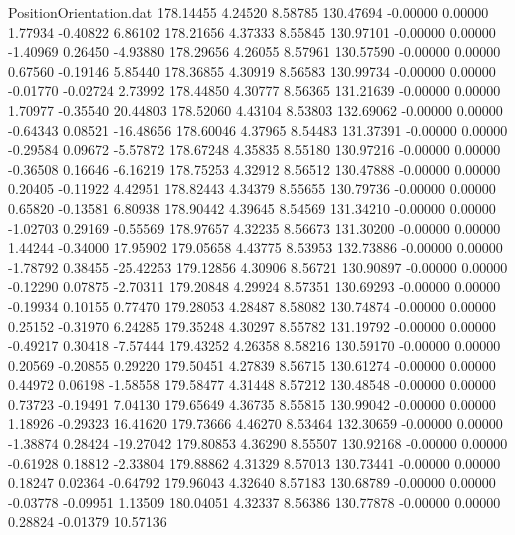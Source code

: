 \begin{filecontents}{PositionOrientation.dat}
 178.14455    4.24520    8.58785   130.47694   -0.00000    0.00000    1.77934   -0.40822    6.86102
 178.21656    4.37333    8.55845   130.97101   -0.00000    0.00000   -1.40969    0.26450   -4.93880
 178.29656    4.26055    8.57961   130.57590   -0.00000    0.00000    0.67560   -0.19146    5.85440
 178.36855    4.30919    8.56583   130.99734   -0.00000    0.00000   -0.01770   -0.02724    2.73992
 178.44850    4.30777    8.56365   131.21639   -0.00000    0.00000    1.70977   -0.35540   20.44803
 178.52060    4.43104    8.53803   132.69062   -0.00000    0.00000   -0.64343    0.08521  -16.48656
 178.60046    4.37965    8.54483   131.37391   -0.00000    0.00000   -0.29584    0.09672   -5.57872
 178.67248    4.35835    8.55180   130.97216   -0.00000    0.00000   -0.36508    0.16646   -6.16219
 178.75253    4.32912    8.56512   130.47888   -0.00000    0.00000    0.20405   -0.11922    4.42951
 178.82443    4.34379    8.55655   130.79736   -0.00000    0.00000    0.65820   -0.13581    6.80938
 178.90442    4.39645    8.54569   131.34210   -0.00000    0.00000   -1.02703    0.29169   -0.55569
 178.97657    4.32235    8.56673   131.30200   -0.00000    0.00000    1.44244   -0.34000   17.95902
 179.05658    4.43775    8.53953   132.73886   -0.00000    0.00000   -1.78792    0.38455  -25.42253
 179.12856    4.30906    8.56721   130.90897   -0.00000    0.00000   -0.12290    0.07875   -2.70311
 179.20848    4.29924    8.57351   130.69293   -0.00000    0.00000   -0.19934    0.10155    0.77470
 179.28053    4.28487    8.58082   130.74874   -0.00000    0.00000    0.25152   -0.31970    6.24285
 179.35248    4.30297    8.55782   131.19792   -0.00000    0.00000   -0.49217    0.30418   -7.57444
 179.43252    4.26358    8.58216   130.59170   -0.00000    0.00000    0.20569   -0.20855    0.29220
 179.50451    4.27839    8.56715   130.61274   -0.00000    0.00000    0.44972    0.06198   -1.58558
 179.58477    4.31448    8.57212   130.48548   -0.00000    0.00000    0.73723   -0.19491    7.04130
 179.65649    4.36735    8.55815   130.99042   -0.00000    0.00000    1.18926   -0.29323   16.41620
 179.73666    4.46270    8.53464   132.30659   -0.00000    0.00000   -1.38874    0.28424  -19.27042
 179.80853    4.36290    8.55507   130.92168   -0.00000    0.00000   -0.61928    0.18812   -2.33804
 179.88862    4.31329    8.57013   130.73441   -0.00000    0.00000    0.18247    0.02364   -0.64792
 179.96043    4.32640    8.57183   130.68789   -0.00000    0.00000   -0.03778   -0.09951    1.13509
 180.04051    4.32337    8.56386   130.77878   -0.00000    0.00000    0.28824   -0.01379   10.57136

\end{filecontents}
